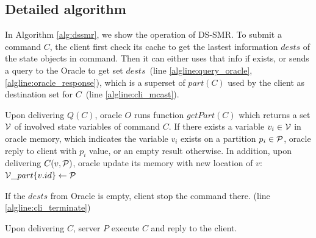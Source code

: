 \subsection{Detailed algorithm}
\label{sec:detailalg}

In Algorithm \ref{alg:dssmr}, we show the operation of DS-SMR. 
To submit a command $C$, the client first check its cache to get the lastest information $dests$ of the state objects in command. Then it can either uses that info if exists, or sends a query to the Oracle to get set $dests$~(line \ref{algline:query_oracle}, \ref{algline:oracle_response}), which is a superset of $part(C)$ used by the client as destination set for $C$~(line \ref{algline:cli_mcast}). 

Upon delivering $Q(C)$, oracle $O$ runs function $getPart(C)$ which returns a set $\mathcal{V}$ of involved state variables of command $C$. If there exists a variable $v_i \in \mathcal{V}$ in oracle memory, which indicates the variable $v_i$ exists on a partition $p_i \in \mathcal{P}$, oracle reply to client with $p_i$ value, or an empty result otherwise. In addition, upon delivering $C(v, \mathcal{P})$, oracle update its memory with new location of $v$: $\mathcal{V}\_part\{v.id\} \leftarrow \mathcal{P}$

If the $dests$ from Oracle is empty, client stop the command there. (line \ref{algline:cli_terminate})

Upon delivering $C$, server $P$ execute $C$ and reply to the client. 


